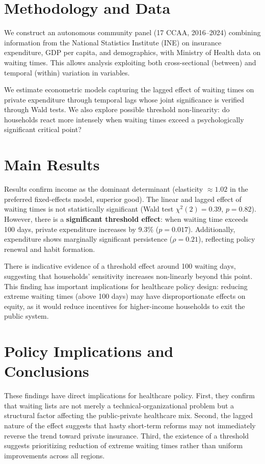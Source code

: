 \documentclass[12pt, a4paper, twoside]{report}
\begin{document}
\section*{Methodology and Data}

We construct an autonomous community panel (17 CCAA, 2016--2024) combining information from the National Statistics Institute (INE) on insurance expenditure, GDP per capita, and demographics, with Ministry of Health data on waiting times. This allows analysis exploiting both cross-sectional (between) and temporal (within) variation in variables.

We estimate econometric models capturing the lagged effect of waiting times on private expenditure through temporal lags whose joint significance is verified through Wald tests. We also explore possible threshold non-linearity: do households react more intensely when waiting times exceed a psychologically significant critical point?

\section*{Main Results}

Results confirm income as the dominant determinant (elasticity $\approx 1.02$ in the preferred fixed-effects model, superior good). The linear and lagged effect of waiting times is not statistically significant (Wald test $\chi^2(2) = 0.39$, $p = 0.82$). However, there is a \textbf{significant threshold effect}: when waiting time exceeds 100 days, private expenditure increases by 9.3\% ($p = 0.017$). Additionally, expenditure shows marginally significant persistence ($\rho = 0.21$), reflecting policy renewal and habit formation.

There is indicative evidence of a threshold effect around 100 waiting days, suggesting that households' sensitivity increases non-linearly beyond this point. This finding has important implications for healthcare policy design: reducing extreme waiting times (above 100 days) may have disproportionate effects on equity, as it would reduce incentives for higher-income households to exit the public system.

\section*{Policy Implications and Conclusions}

These findings have direct implications for healthcare policy. First, they confirm that waiting lists are not merely a technical-organizational problem but a structural factor affecting the public-private healthcare mix. Second, the lagged nature of the effect suggests that hasty short-term reforms may not immediately reverse the trend toward private insurance. Third, the existence of a threshold suggests prioritizing reduction of extreme waiting times rather than uniform improvements across all regions.
\end{document}
